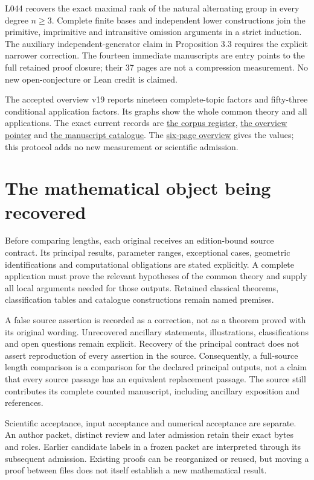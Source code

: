 \documentclass[11pt,a4paper]{article}
\begin{document}
L044 recovers the exact maximal rank of the natural alternating group in
every degree $n\geq3$. Complete finite bases and independent lower constructions
join the primitive, imprimitive and intransitive omission arguments in a
strict induction. The auxiliary independent-generator claim in Proposition 3.3
requires the explicit narrower correction. The fourteen immediate manuscripts
are entry points to the full retained proof closure; their 37 pages are not
a compression measurement. No new open-conjecture or Lean credit is claimed.

The accepted overview v19 reports nineteen complete-topic factors and fifty-three
conditional application factors. Its graphs show the whole common theory and
all applications. The exact current records are
\href{corpus/latest.json}{the corpus register},
\href{overview/latest.json}{the overview pointer} and
\href{../papers/latest_catalogue.json}{the manuscript catalogue}.
The \href{overview/v19/packet/reader.pdf}{six-page overview} gives the values;
this protocol adds no new measurement or scientific admission.

\section{The mathematical object being recovered}

Before comparing lengths, each original receives an edition-bound source
contract. Its principal results, parameter ranges, exceptional cases, geometric
identifications and computational obligations are stated explicitly. A complete
application must prove the relevant hypotheses of the common theory and supply
all local arguments needed for those outputs. Retained classical theorems,
classification tables and catalogue constructions remain named premises.

A false source assertion is recorded as a correction, not as a theorem proved
with its original wording. Unrecovered ancillary statements, illustrations,
classifications and open questions remain explicit. Recovery of the principal
contract does not assert reproduction of every assertion in the source.
Consequently, a full-source length comparison is a comparison for the declared
principal outputs, not a claim that every source passage has an equivalent
replacement passage. The source still contributes its complete counted
manuscript, including ancillary exposition and references.

Scientific acceptance, input acceptance and numerical acceptance are separate.
An author packet, distinct review and later admission retain their exact bytes
and roles. Earlier candidate labels in a frozen packet are interpreted through
its subsequent admission. Existing proofs can be reorganized or reused, but
moving a proof between files does not itself establish a new mathematical result.
\end{document}
